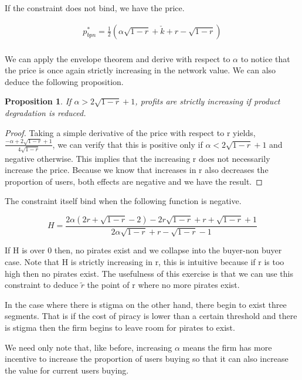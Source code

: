 \documentclass{article}
\newtheorem{proposition}{Proposition}
\begin{document}
If the constraint does not bind, we have the price. 

\begin{equation}\label{TNB}
\begin{array}{ll}
p_{bpn}^* = \frac{1}{2} \left(\alpha \sqrt{1-r}+\check{k}+r-\sqrt{1-r}\right) \\
\end{array}
\end{equation}

We can apply the envelope theorem and derive with respect to $\alpha$ to notice that the price is once again strictly increasing in the network value. We can also deduce the following proposition. 

\begin{proposition}
If $\alpha>2 \sqrt{1-r}+1$, profits are strictly increasing if product degradation is reduced. 
\end{proposition}

\begin{proof}
Taking a simple derivative of the price with respect to r yields,$\frac{-\alpha+2 \sqrt{1-r}+1}{4 \sqrt{1-r}}$, we can verify that this is positive only if $\alpha<2 \sqrt{1-r}+1$ and negative otherwise. This implies that the increasing r does not necessarily increase the price. Because we know that increases in r also decreases the proportion of users, both effects are negative and we have the result. 
\end{proof}

The constraint itself bind when the following function is negative.  

\begin{equation}
H = \frac{2 \alpha \left(2 r+\sqrt{1-r}-2\right)-2 r \sqrt{1-r} +r+\sqrt{1-r}+1}{2 \alpha \sqrt{1-r}+r-\sqrt{1-r}-1}
\end{equation}

If H is over 0 then, no pirates exist and we collapse into the buyer-non buyer case. Note that H is strictly increasing in r, this is intuitive because if r is too high then no pirates exist. The usefulness of this exercise is that we can use this constraint to deduce $\tilde{r}$ the point of r where no more pirates exist. 

In the case where there is stigma on the other hand, there begin to exist three segments. That is if the cost of piracy is lower than a certain threshold and there is stigma then the firm begins to leave room for pirates to exist. 

We need only note that, like before, increasing $\alpha$ means the firm has more incentive to increase the proportion of users buying so that it can also increase the value for current users buying. 
\end{document}
